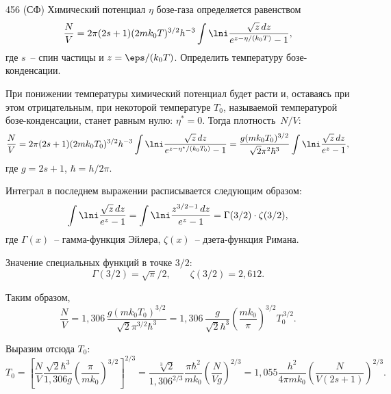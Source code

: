 \documentclass[pscyr]{hedwork}
\begin{document}
  \begin{task}{456 (СФ)}{
    Химический потенциал \( \eta \) бозе-газа определяется равенством
    \[
      \frac{N}{V} = 2\pi(2s + 1)(2mk_0 T)^{3/2} h^{-3}
        \int\lni \frac{\sqrt{z}\,dz}{e^{z - \eta / (k_0 T)} - 1},
    \]
    где \( s \)~-- спин частицы и \( z = \eps / (k_0 T) \). Определить
    температуру бозе-кон\-ден\-са\-ции.
  }
  
    При понижении температуры химический потенциал будет расти и, оставаясь
    при этом отрицательным, при некоторой температуре \(T_0 \), называемой
    температурой бозе-конденсации, станет равным нулю: \( \eta^* = 0 \).
    Тогда плотность~\( N / V \):
    \[
      \frac{N}{V} = 2\pi(2s + 1)(2mk_0 T_0)^{3/2} h^{-3}
        \int\lni \frac{\sqrt{z}\,dz}{e^{z - \eta^* / (k_0 T_0)} - 1} =
        \frac{g(mk_0 T_0)^{3/2}}{\sqrt{2}\pi^2\hbar^3}
        \int\lni \frac{\sqrt{z}\,dz}{e^z - 1},
    \]
    где \( g = 2s + 1 \), \( \hbar = h / 2\pi \).
    
    Интеграл в последнем выражении расписывается следующим образом:
    \[
      \int\lni \frac{\sqrt{z}\,dz}{e^z - 1} =
        \int\lni \frac{z^{3/2 - 1}\,dz}{e^z - 1} = \Gamma(3/2)\cdot\zeta(3/2),
    \]
    где \( \Gamma(x) \)~-- гамма-функция Эйлера, \( \zeta(x) \)~--
    дзета-функция Римана.
      
    Значение специальных функций в точке \( 3/2 \):
    \[
      \Gamma(3/2) = \sqrt{\pi} / 2, \qquad \zeta(3/2) = 2,\!612.
    \]
    
    Таким образом,
    \[
      \frac{N}{V} = 1,\!306\,\frac{g(mk_0 T_0)^{3/2}}{\sqrt{2}\pi^{3/2}\hbar^3}
        = 1,\!306\,\frac{g}{\sqrt{2}\hbar^3}
        \left(\frac{mk_0}{\pi}\right)^{\!\!3/2}\!\!T_0^{\,3/2}.
    \]
    
    Выразим отсюда \( T_0 \):
    \[
      T_0 = \left[\frac{N}{V}\frac{\sqrt{2}\hbar^3}{1,\!306 g}
        \left(\frac{\pi}{mk_0}\right)^{\!\!3/2}\right]^{\!\!2/3} \!\!\! =
        \frac{\sqrt[3]{2}}{1,\!306^{2/3}}\frac{\pi\hbar^2}{mk_0}
        \left(\frac{N}{Vg}\right)^{\!\!2/3} \!\!\! =
        1,\!055\frac{h^2}{4\pi mk_0}
        \left(\frac{N}{V(2s + 1)}\right)^{\!\!2/3}\!\!.
    \]

  \end{task}
\end{document}
